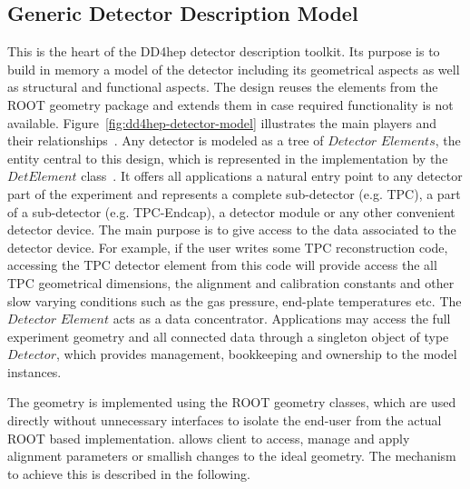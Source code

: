 \documentclass[10pt,a4paper]{article}
\begin{document}
\subsection{Generic Detector Description Model}
\label{subsec:generic-model}

\noindent
This is the heart of the DD4hep detector description toolkit. Its purpose is 
to build in memory a model of the detector including its geometrical aspects
as well as structural and functional aspects. The design reuses the elements 
from the ROOT geometry package and extends them in case required functionality 
is not available. Figure~\ref{fig:dd4hep-detector-model} illustrates the main
players and their relationships~\cite{bib:DD4hep}.
Any detector is modeled as a tree of $Detector$ $Elements$, the entity 
central to this design, which is represented in the implementation by 
the $DetElement$ class~\cite{bib:LHCb-geometry}. It offers all
applications a natural entry point to any detector part of the experiment
and represents a complete sub-detector (e.g. TPC), a part of a 
sub-detector (e.g. TPC-Endcap), a detector module or any other convenient 
detector device. 
The main purpose is to give access to the data associated 
to the detector device. For example, if the user writes some TPC reconstruction 
code, accessing the TPC detector element from this code will provide access 
the all TPC geometrical dimensions, the alignment and calibration constants 
and other slow varying conditions such as the gas pressure, end-plate 
temperatures etc. The $Detector$ $Element$ acts as a data concentrator. 
Applications may access the full experiment geometry and all connected data
through a singleton object of type $Detector$, which provides 
management, bookkeeping and ownership to the model instances.

\noindent
The geometry is implemented using the ROOT geometry classes, which are used
directly without unnecessary interfaces to isolate the end-user from the 
actual ROOT based implementation.
\DDA allows client to access, manage and apply alignment parameters or 
smallish changes to the ideal geometry. The mechanism to achieve this 
is described in the following.
\end{document}
